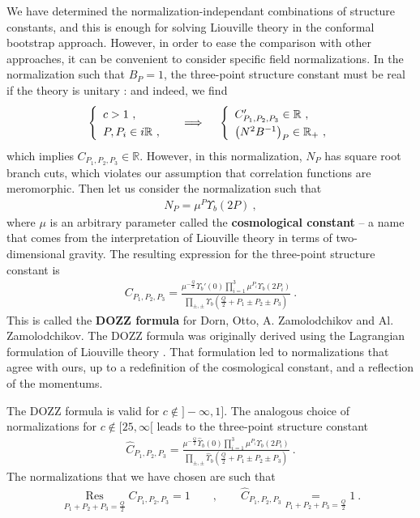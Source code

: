 \documentclass[12pt, a4paper, notitlepage, twoside]{report}
\numberwithin{equation}{section}
\theoremstyle{break}
\begin{document}
We have determined the normalization-independant combinations of structure constants, and this is enough for solving Liouville theory in the conformal bootstrap approach. However, in order to ease the comparison with other approaches, it can be convenient to consider specific field normalizations. 
In the normalization such that $B_P=1$, the three-point structure constant must be real if the theory is unitary \cite{rib14b}: and indeed, we find
\begin{align}
\renewcommand{\arraystretch}{1.3}
 \left\{\begin{array}{l} c > 1\ , \\ P,P_i\in i\mathbb{R}\ , \end{array}\right. \quad \implies \quad \left\{\begin{array}{l} C'_{P_1,P_2,P_3}\in\mathbb{R}\ , \\ \left(N^2B^{-1}\right)_P\in \mathbb{R}_+\ , \end{array}\right.
\end{align}
which implies $C_{P_1,P_2,P_3}\in \mathbb{R}$. However, in this normalization, $N_P$ has square root branch cuts, which violates our assumption that correlation functions are meromorphic. Then let us  consider the normalization such that 
\begin{align}
 N_P = \mu^{P}\Upsilon_b(2P)\ ,
 \label{nop}
\end{align}
where $\mu$ is an arbitrary parameter called the \textbf{\boldmath cosmological constant} -- a name that comes from the interpretation of Liouville theory in terms of two-dimensional gravity.
The resulting expression for the three-point structure constant is
\begin{align}
 C_{P_1,P_2,P_3} =  \frac{\mu^{-\frac{Q}{2}}\Upsilon_b'(0)\prod_{i=1}^3 \mu^{P_i}\Upsilon_b(2P_i) }{\prod_{\pm,\pm} \Upsilon_b\left(\tfrac{Q}{2}+P_1\pm P_2 \pm P_3\right)} \ .
\label{caaa}
\end{align}
This is called the \textbf{\boldmath DOZZ formula} for Dorn, Otto, A.
Zamolodchikov and Al. Zamolodchikov. 
The DOZZ formula was originally derived using the Lagrangian formulation of Liouville theory \cite{zz95}. 
That formulation led to normalizations that agree with ours, 
up to a redefinition of the cosmological constant, and a reflection of the momentums. 

The DOZZ formula is valid for $c\notin ]-\infty, 1]$. The analogous choice of normalizations for $c\notin [25,\infty[$ leads to the three-point structure constant 
\begin{align}
 \hat C_{P_1,P_2,P_3} =  \frac{\mu^{-\frac{Q}{2}}\hat\Upsilon_b(0)\prod_{i=1}^3 \mu^{P_i}\hat\Upsilon_b(2P_i) }{\prod_{\pm,\pm} \hat\Upsilon_b\left(\tfrac{Q}{2}+P_1\pm P_2 \pm P_3\right)} \ .
\label{hc}
\end{align}
The normalizations that we have chosen are such that
\begin{align}
 \underset{P_1+P_2+P_3=\frac{Q}{2}}{\operatorname{Res}} C_{P_1,P_2,P_3} = 1 \qquad , \qquad \hat C_{P_1,P_2,P_3}\underset{P_1+P_2+P_3=\frac{Q}{2}}{=} 1\ .
\label{chco}
 \end{align}
\end{document}
